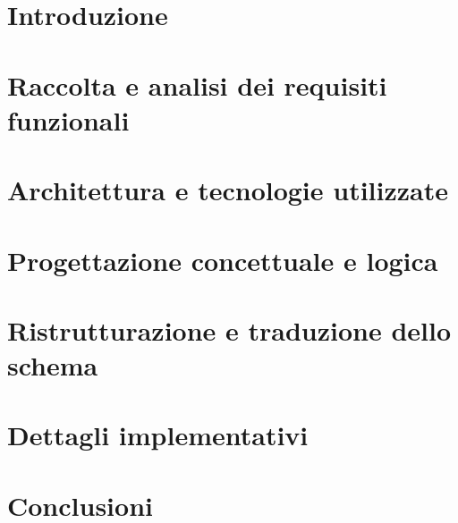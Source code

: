 \frontmatter
\maketitle
\dedication{
  Placeholder
}

\tableofcontents

\mainmatter

\chapter{Introduzione}


\chapter{Raccolta e analisi dei requisiti funzionali}


\chapter{Architettura e tecnologie utilizzate}


\chapter{Progettazione concettuale e logica}


\chapter{Ristrutturazione e traduzione dello schema}


\chapter{Dettagli implementativi}


\chapter{Conclusioni}


\backmatter
